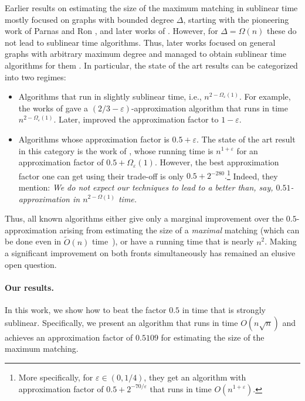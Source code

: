 \documentclass[letterpaper,11pt]{article}
\renewcommand{\epsilon}{\varepsilon}
\newcommand{\wt}[1]{\ensuremath{\widetilde{#1}}}
\begin{document}
Earlier results on estimating the size of the maximum matching in sublinear time mostly focused on graphs with bounded degree $\Delta$, starting with the pioneering work of Parnas and Ron \cite{ParnasRon07}, and later works of \cite{nguyen2008constant, YoshidaYI09, RubinfeldTVX11, AlonRVX12, LeviRY17, Ghaffari-FOCS22}. However, for $\Delta=\Omega(n)$ these do not lead to sublinear time algorithms.
Thus, later works focused on general graphs with arbitrary maximum degree and managed to obtain sublinear time algorithms for them \cite{chen2020sublinear,kapralov2020space,Behnezhad21,BehnezhadRRS23, bhattacharya2023sublinear,bhattacharya2023dynamic}. In particular, the state of the art results can be categorized into two regimes:
\begin{itemize}\item Algorithms that run in slightly sublinear time, i.e., $n^{2-\Omega_{\epsilon}(1)}$. For example, the works of \cite{behnezhad2023sublinear, bhattacharya2023sublinear} gave a $(2/3-\epsilon)$-approximation algorithm that runs in time $n^{2-\Omega_{\epsilon}(1)}$. Later, \cite{bhattacharya2023dynamic} improved the approximation factor to $1-\epsilon$.
\item Algorithms whose approximation factor is $0.5+\epsilon$. The state of the art result in this category is the work of \cite{BehnezhadRRS23}, whose running time is $n^{1+\epsilon}$ for an approximation factor of $0.5+\Omega_{\epsilon}(1)$. However, the best approximation factor one can get using their trade-off is only $0.5+2^{-280}.$\footnote{More specifically, for $\epsilon \in (0,1/4)$, they get an algorithm with approximation factor of $0.5+2^{-70/\epsilon}$ that runs in time $O(n^{1+\epsilon})$.} Indeed, they mention: \textit{We do not expect our techniques to lead to a better than, say, $0.51$-approximation in $n^{2-\Omega(1)}$ time.}
\end{itemize}
Thus, all known algorithms either give only a marginal improvement over the $0.5$-approximation
arising from estimating the size of a \emph{maximal} matching
(which can be done even in $\wt{O}(n)$ time~\cite{Behnezhad21}),
or have a running time that is nearly $n^2$.
Making a significant improvement on both fronts simultaneously
has remained an elusive open question.

\paragraph{Our results.} In this work, we show how to beat the  factor $0.5$ in time that is strongly sublinear. Specifically, we present an algorithm that runs in time $O(n\sqrt{n})$ and achieves an approximation factor of $0.5109$ for estimating the size of the maximum matching.
\end{document}
